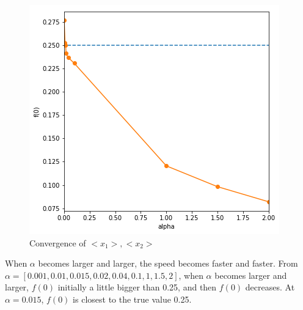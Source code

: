 \documentclass{article}
\begin{document}
\begin{figure}[h!]
\centering
\includegraphics[scale=0.5]{HW5P4.png}
\caption{Convergence of $<x_{1}>, <x_{2}>$}
\end{figure}

When $\alpha$ becomes larger and larger, the speed becomes faster and faster.
From $\alpha = [0.001,0.01,0.015,0.02, 0.04, 0.1,1,1.5,2]$, when $\alpha$ becomes larger and larger, $f(0)$ initially a little bigger than 0.25, and then $f(0)$ decreases. At $\alpha = 0.015$, $f(0)$ is closest to the true value 0.25.


%
%
\end{document}
